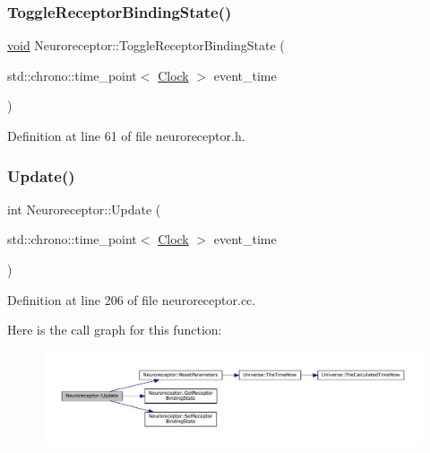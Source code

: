 \subsubsection{\texorpdfstring{Toggle\+Receptor\+Binding\+State()}{ToggleReceptorBindingState()}}
{\footnotesize\ttfamily \mbox{\hyperlink{glad_8h_a950fc91edb4504f62f1c577bf4727c29}{void}} Neuroreceptor\+::\+Toggle\+Receptor\+Binding\+State (\begin{DoxyParamCaption}\item[{std\+::chrono\+::time\+\_\+point$<$ \mbox{\hyperlink{universe_8h_a0ef8d951d1ca5ab3cfaf7ab4c7a6fd80}{Clock}} $>$}]{event\+\_\+time }\end{DoxyParamCaption})\hspace{0.3cm}{\ttfamily [inline]}}



Definition at line 61 of file neuroreceptor.\+h.

\mbox{\label{class_neuroreceptor_ab8f288a095fb028793e7246a42de233b}} 
\subsubsection{\texorpdfstring{Update()}{Update()}}
{\footnotesize\ttfamily int Neuroreceptor\+::\+Update (\begin{DoxyParamCaption}\item[{std\+::chrono\+::time\+\_\+point$<$ \mbox{\hyperlink{universe_8h_a0ef8d951d1ca5ab3cfaf7ab4c7a6fd80}{Clock}} $>$}]{event\+\_\+time }\end{DoxyParamCaption})}



Definition at line 206 of file neuroreceptor.\+cc.

Here is the call graph for this function\+:\nopagebreak
\begin{figure}[H]
\begin{center}
\leavevmode
\includegraphics[width=350pt]{class_neuroreceptor_ab8f288a095fb028793e7246a42de233b_cgraph}
\end{center}
\end{figure}


